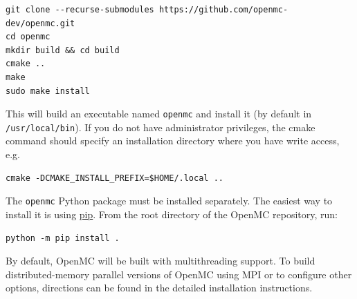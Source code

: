 \begin{verbatim}
git clone --recurse-submodules https://github.com/openmc-dev/openmc.git
cd openmc
mkdir build && cd build
cmake ..
make
sudo make install
\end{verbatim}

This will build an executable named \texttt{openmc} and install it (by default in
\texttt{/usr/local/bin}). If you do not have administrator privileges, the cmake command
should specify an installation directory where you have write access, e.g.

\begin{verbatim}
cmake -DCMAKE_INSTALL_PREFIX=$HOME/.local ..
\end{verbatim}

The \texttt{openmc} Python package must be installed separately. The easiest way
to install it is using \href{https://pip.pypa.io/en/stable/}{pip}.
From the root directory of the OpenMC repository, run:

\begin{verbatim}
python -m pip install .
\end{verbatim}

By default, OpenMC will be built with multithreading support. To build
distributed-memory parallel versions of OpenMC using MPI or to configure other
options, directions can be found in the detailed installation instructions.